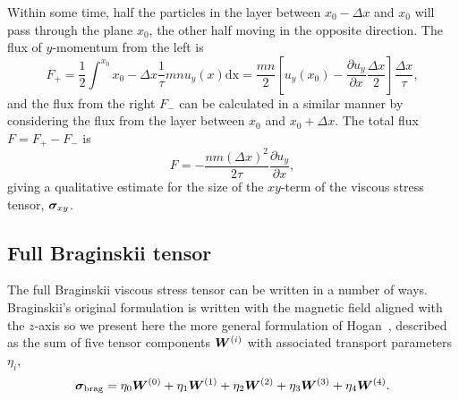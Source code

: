 Within some time, half the particles in the layer between $x_0 - \Delta x$ and $x_0$ will pass through the plane $x_0$, the other half moving in the opposite direction. The flux of $y$-momentum from the left is
\begin{equation}
  \label{eq:momentum_flux_left}
F_{+} = \frac{1}{2} \int^{x_0}{x_0 - \Delta x} \frac{1}{\tau} m n u_y(x) \text{dx} = \frac{mn}{2} \left[ u_y(x_0) - \frac{\partial u_y}{\partial x} \frac{\Delta x}{2} \right] \frac{\Delta x}{\tau},
\end{equation}
and the flux from the right $F_{-}$ can be calculated in a similar manner by considering the flux from the layer between $x_0$ and $x_0 + \Delta x$. The total flux $F = F_+ - F_-$ is
\begin{equation}
  \label{eq:total_momentum_flux}
  F = - \frac{nm(\Delta x)^2}{2\tau} \frac{\partial u_y}{\partial x},
\end{equation}
giving a qualitative estimate for the size of the $xy$-term of the viscous stress tensor, ${\bm \sigma}_{xy}$. 

\subsection{Full Braginskii tensor}

The full Braginskii viscous stress tensor can be written in a number of ways. Braginskii's original formulation is written with the magnetic field aligned with the $z$-axis so we present here the more general formulation of Hogan~\cite{hoganCollisionalTransportMomentum1984}, described as the sum of five tensor components ${\bm W}^{(i)}$ with associated transport parameters $\eta_i$,
\begin{equation}
\label{eq:braginskii_tensor}
{\bm \sigma}_{\text{brag}} = \eta_0 {\bm W}^{(0)} + \eta_1 {\bm W}^{(1)} + \eta_2 {\bm W}^{(2)} + \eta_3 {\bm W}^{(3)} + \eta_4 {\bm W}^{(4)}.
\end{equation}

